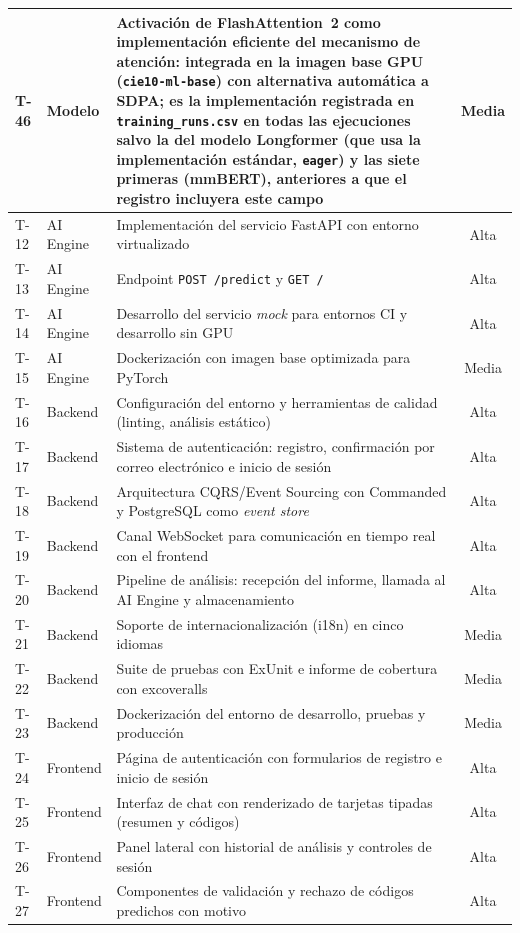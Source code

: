 \begin{center}
\begin{longtable}{llP{7.5cm}c}
T-46 & Modelo & Activación de FlashAttention~2 como implementación eficiente del mecanismo de atención: integrada en la imagen base GPU (\texttt{cie10-ml-base}) con alternativa automática a SDPA; es la implementación registrada en \texttt{training\_runs.csv} en todas las ejecuciones salvo la del modelo Longformer (que usa la implementación estándar, \texttt{eager}) y las siete primeras (mmBERT), anteriores a que el registro incluyera este campo & Media \\
\hline
T-12 & AI Engine & Implementación del servicio FastAPI con entorno virtualizado & Alta \\
T-13 & AI Engine & Endpoint \texttt{POST /predict} y \texttt{GET /} & Alta \\
T-14 & AI Engine & Desarrollo del servicio \emph{mock} para entornos CI y desarrollo sin GPU & Alta \\
T-15 & AI Engine & Dockerización con imagen base optimizada para PyTorch & Media \\
\hline
T-16 & Backend & Configuración del entorno y herramientas de calidad (linting, análisis estático) & Alta \\
T-17 & Backend & Sistema de autenticación: registro, confirmación por correo electrónico e inicio de sesión & Alta \\
T-18 & Backend & Arquitectura CQRS/Event Sourcing con Commanded y PostgreSQL como \emph{event store} & Alta \\
T-19 & Backend & Canal WebSocket para comunicación en tiempo real con el frontend & Alta \\
T-20 & Backend & Pipeline de análisis: recepción del informe, llamada al AI Engine y almacenamiento & Alta \\
T-21 & Backend & Soporte de internacionalización (i18n) en cinco idiomas & Media \\
T-22 & Backend & Suite de pruebas con ExUnit e informe de cobertura con excoveralls & Media \\
T-23 & Backend & Dockerización del entorno de desarrollo, pruebas y producción & Media \\
\hline
T-24 & Frontend & Página de autenticación con formularios de registro e inicio de sesión & Alta \\
T-25 & Frontend & Interfaz de chat con renderizado de tarjetas tipadas (resumen y códigos) & Alta \\
T-26 & Frontend & Panel lateral con historial de análisis y controles de sesión & Alta \\
T-27 & Frontend & Componentes de validación y rechazo de códigos predichos con motivo & Alta \\

\end{longtable}
\end{center}

